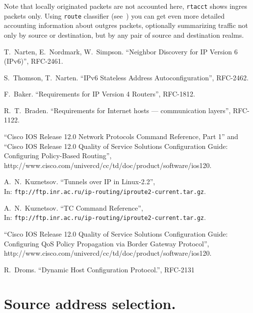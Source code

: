 Note that locally originated packets are not accounted here,
\verb|rtacct| shows ingres packets only. Using \verb|route|
classifier (see~\cite{TC-CREF}) you can get even more detailed
accounting information about outgres packets, optionally
summarizing traffic not only by source or destination, but
by any pair of source and destination realms.


\begin{thebibliography}{99}
 T.~Narten, E.~Nordmark, W.~Simpson.
``Neighbor Discovery for IP Version 6 (IPv6)'', RFC-2461.

 S.~Thomson, T.~Narten.
``IPv6 Stateless Address Autoconfiguration'', RFC-2462.

 F.~Baker.
``Requirements for IP Version 4 Routers'', RFC-1812.

 R.~T.~Braden.
``Requirements for Internet hosts --- communication layers'', RFC-1122.

 ``Cisco IOS Release 12.0 Network Protocols
Command Reference, Part 1'' and
``Cisco IOS Release 12.0 Quality of Service Solutions
Configuration Guide: Configuring Policy-Based Routing'',\\
http://www.cisco.com/univercd/cc/td/doc/product/software/ios120.

 A.~N.~Kuznetsov.
``Tunnels over IP in Linux-2.2'', \\
In: {\tt ftp://ftp.inr.ac.ru/ip-routing/iproute2-current.tar.gz}.

 A.~N.~Kuznetsov. ``TC Command Reference'',\\
In: {\tt ftp://ftp.inr.ac.ru/ip-routing/iproute2-current.tar.gz}.

 ``Cisco IOS Release 12.0 Quality of Service Solutions
Configuration Guide: Configuring QoS Policy Propagation via
Border Gateway Protocol'',\\
http://www.cisco.com/univercd/cc/td/doc/product/software/ios120.

 R.~Droms.
``Dynamic Host Configuration Protocol.'', RFC-2131

\end{thebibliography}




\appendix
{}

\section{Source address selection.}
\label{ADDR-SEL}

